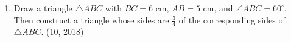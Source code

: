 \begin{enumerate}[label=\thesubsection.\arabic*,ref=\thesubsection.\theenumi]
    \item Draw a triangle $\triangle ABC$ with $BC = 6 \text{ cm}$, $AB = 5 \text{ cm}$, and $\angle ABC = 60^\circ$. Then construct a triangle whose sides are $\frac{3}{4}$ of the corresponding sides of $\triangle ABC$. \hfill (10, 2018)
\end{enumerate}
